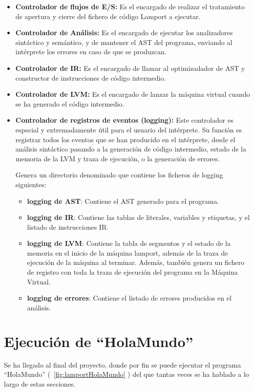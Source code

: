 \begin{itemize}
    \item \textbf{Controlador de flujos de E/S:} Es el encargado de realizar el tratamiento de apertura y cierre del fichero de código Lamport a ejecutar.
    \item \textbf{Controlador de Análisis:} Es el encargado de ejecutar los analizadores sintáctico y semántico, y de mantener el AST del programa, enviando al intérprete los errores en caso de que se produzcan.
    \item \textbf{Controlador de IR:} Es el encargado de llamar al optimizadador de AST y constructor de instrucciones de código intermedio.
    \item \textbf{Controlador de LVM:} Es el encargado de lanzar la máquina virtual cuando se ha generado el código intermedio.
    \item \textbf{Controlador de registros de eventos (logging):} Este controlador es especial y extremadamente útil para el usuario del intérprete. Su función es registrar todos los eventos que se han producido en el intérprete, desde el análisis sintáctico pasando a la generación de código intermedio, estado de la memoria de la LVM y traza de ejecución, o la generación de errores.

    Genera un directorio denominado  que contiene los ficheros de logging siguientes:
    \begin{itemize}
        \item \textbf{logging de AST}: Contiene el AST generado para el programa.
        \item \textbf{logging de IR}: Contiene las tablas de literales, variables y etiquetas, y el listado de instrucciones IR.
        \item \textbf{logging de LVM}: Contiene la tabla de segmentos y el estado de la memoria en el inicio de la máquina lamport, además de la traza de ejecución de la máquina al terminar. Además, también genera un fichero de registro con toda la traza de ejecución del programa en la Máquina Virtual.
        \item \textbf{logging de errores}: Contiene el listado de errores producidos en el análisis.
    \end{itemize}
\end{itemize}

\section{Ejecución de ``HolaMundo''}
Se ha llegado al final del proyecto, donde por fin se puede ejecutar el programa ``HolaMundo'' (~\ref{fig:lamportHolaMundo} ) del que tantas veces se ha hablado a lo largo de estas secciones. 


